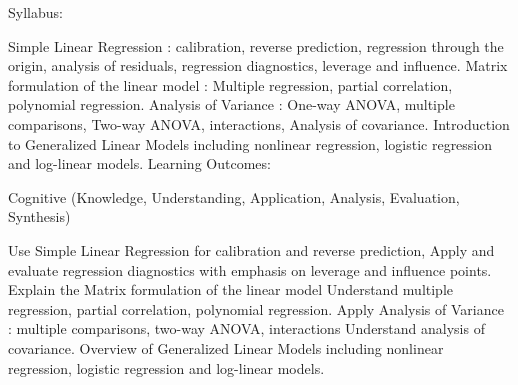 Syllabus:

Simple Linear Regression : calibration, reverse prediction, regression through the origin, analysis of residuals, regression diagnostics, leverage and influence.
Matrix formulation of the linear model : Multiple regression, partial correlation, polynomial regression.
Analysis of Variance : One-way ANOVA, multiple comparisons, Two-way ANOVA, interactions, Analysis of covariance.
Introduction to Generalized Linear Models including nonlinear regression, logistic regression and log-linear models.
Learning Outcomes:

Cognitive (Knowledge, Understanding, Application, Analysis, Evaluation, Synthesis)

Use Simple Linear Regression for calibration and reverse prediction, 
Apply and evaluate regression diagnostics with emphasis on leverage and influence points.
Explain the Matrix formulation of the linear model
Understand multiple regression, partial correlation, polynomial regression.
Apply Analysis of Variance : multiple comparisons, two-way ANOVA, interactions
Understand analysis of covariance.
Overview of Generalized Linear Models including nonlinear regression, logistic regression and log-linear models.
